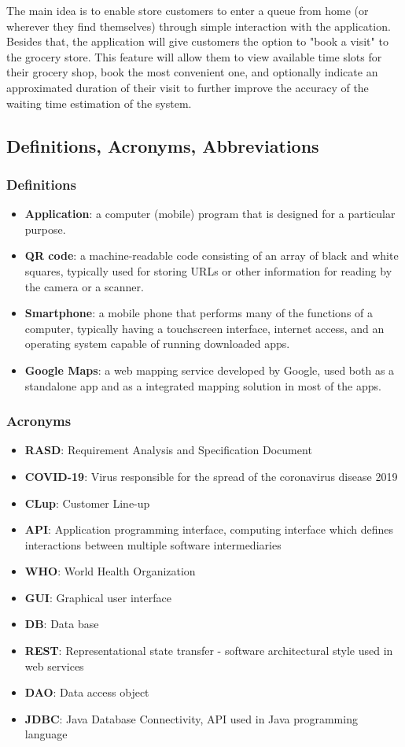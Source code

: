 The main idea is to enable store customers to enter a queue from home (or wherever they find themselves) through simple interaction with the application. Besides that, the application will give customers the option to "book a visit" to the grocery store. This feature will allow them to view available time slots for their grocery shop, book the most convenient one, and optionally indicate an approximated duration of their visit to further improve the accuracy of the waiting time estimation of the system.  

\newpage

\subsection{Definitions, Acronyms, Abbreviations}
\subsubsection{Definitions}
\begin{itemize} 
	\item \textbf{Application}: a computer (mobile) program that is designed for a particular purpose. 
	\item \textbf{QR code}: a machine-readable code consisting of an array of black and white squares, typically used for storing URLs or other information for reading by the camera or a scanner. 
	\item \textbf{Smartphone}: a mobile phone that performs many of the functions of a computer, typically having a touchscreen interface, internet access, and an operating system capable of running downloaded apps. 
	\item \textbf{Google Maps}: a web mapping service developed by Google, used both as a standalone app and as a integrated mapping solution in most of the apps.
\end{itemize}
\subsubsection{Acronyms}
\begin{itemize}
	\item \textbf{RASD}: Requirement Analysis and Specification Document
	\item \textbf{COVID-19}: Virus responsible for the spread of the coronavirus disease 2019
	\item \textbf{CLup}: Customer Line-up
	\item \textbf{API}: Application programming interface, computing interface which defines interactions between multiple software intermediaries 
	\item \textbf{WHO}: World Health Organization
	\item \textbf{GUI}: Graphical user interface
	\item \textbf{DB}: Data base
	\item \textbf{REST}: Representational state transfer - software architectural style used in web services
	\item \textbf{DAO}: Data access object
	\item \textbf{JDBC}: Java Database Connectivity, API used in Java programming language
\end{itemize}
